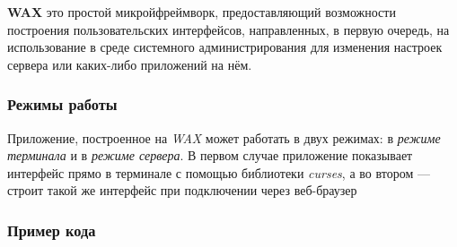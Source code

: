 {\bfseries W\+AX} это простой микройфреймворк, предоставляющий возможности построения пользовательских интерфейсов, направленных, в первую очередь, на использование в среде системного администрирования для изменения настроек сервера или каких-\/либо приложений на нём.

\subsubsection*{Режимы работы}

Приложение, построенное на {\itshape W\+AX} может работать в двух режимах\+: в {\itshape режиме терминала} и в {\itshape режиме сервера}. В первом случае приложение показывает интерфейс прямо в терминале с помощью библиотеки {\itshape curses}, а во втором — строит такой же интерфейс при подключении через веб-\/браузер

\subsubsection*{Пример кода}


